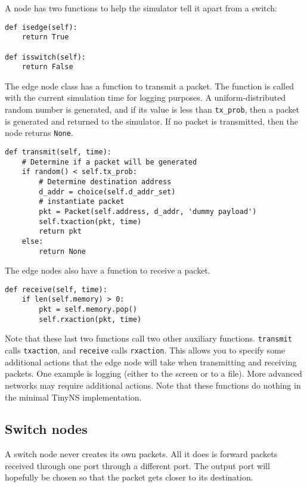 \documentclass[11pt]{report}
\begin{document}
A node has two functions to help the simulator tell it apart from a switch:

\begin{verbatim}
def isedge(self):
    return True

def isswitch(self):
    return False
\end{verbatim}

The edge node class has a function to transmit a packet. The function is called
with the current simulation time for logging purposes. A uniform-distributed
random number is generated, and if its value is less than
\texttt{tx_prob}, then a packet is generated and returned to the
simulator. If no packet is transmitted, then the node returns
\texttt{None}.

\begin{verbatim}
def transmit(self, time):
    # Determine if a packet will be generated
    if random() < self.tx_prob:
        # Determine destination address
        d_addr = choice(self.d_addr_set)
        # instantiate packet
        pkt = Packet(self.address, d_addr, 'dummy payload')
        self.txaction(pkt, time)
        return pkt
    else:
        return None
\end{verbatim}

The edge nodes also have a function to receive a packet.

\begin{verbatim}
def receive(self, time):
    if len(self.memory) > 0:
        pkt = self.memory.pop()
        self.rxaction(pkt, time)
\end{verbatim}

Note that these last two functions call two other auxiliary functions.
\texttt{transmit} calls \texttt{txaction}, and
\texttt{receive} calls \texttt{rxaction}. This allows
you to specify some additional actions that the edge node will take when
transmitting and receiving packets. One example is logging (either to the
screen or to a file). More advanced networks may require additional actions.
Note that these functions do nothing in the minimal TinyNS implementation.

\subsection*{Switch nodes}

A switch node never creates its own packets. All it does is forward packets
received through one port through a different port. The output port will
hopefully be chosen so that the packet gets closer to its destination.
\end{document}
